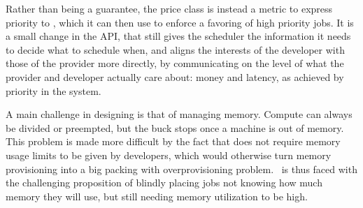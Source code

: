 Rather than being a guarantee, the price class is instead a metric to express
priority to \sys{}, which it can then use to enforce a favoring of high priority
jobs. It is a small change in the API, that still gives the scheduler the
information it needs to decide what to schedule when, and aligns the interests
of the developer with those of the provider more directly, by communicating on
the level of what the provider and developer actually care about: money and
latency, as achieved by priority in the system.




A main challenge in designing \sys{} is that of managing memory. Compute can
always be divided or preempted, but the buck stops once a machine is out of
memory. This problem is made more difficult by the fact that \sys{} does not
require memory usage limits to be given by developers, which would otherwise
turn memory provisioning into a big packing with overprovisioning
problem.~\Sys{} is thus faced with the challenging proposition of blindly
placing jobs not knowing how much memory they will use, but still needing memory
utilization to be high.


 
